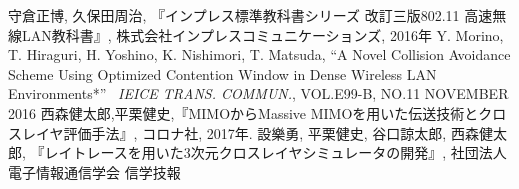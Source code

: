 \documentclass[a4paper,10.5pt]{ltjsarticle}
\begin{document}
\clearpage
{}
\begin{thebibliography}{99}

守倉正博, 久保田周治, 『インプレス標準教科書シリーズ 改訂三版802.11 高速無線LAN教科書』, 株式会社インプレスコミュニケーションズ, 2016年
Y. Morino, T. Hiraguri, H. Yoshino, K. Nishimori, T. Matsuda, ``A Novel Collision Avoidance Scheme Using Optimized Contention Window in Dense Wireless LAN Environments*'' \, \textit{IEICE TRANS. COMMUN.}, VOL.E99-B, NO.11 NOVEMBER 2016
西森健太郎,平栗健史,『MIMOからMassive MIMOを用いた伝送技術とクロスレイヤ評価手法』, コロナ社, 2017年.
設樂勇, 平栗健史, 谷口諒太郎, 西森健太郎, 『レイトレースを用いた3次元クロスレイヤシミュレータの開発』, 社団法人 電子情報通信学会 信学技報

\end{thebibliography}
\end{document}
